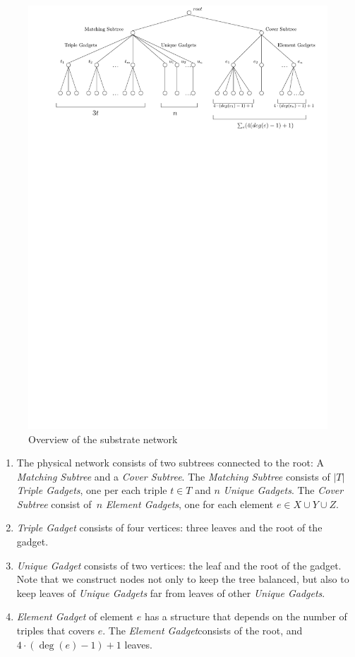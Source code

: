 \documentclass[preprint,12pt]{elsarticle}
\newcommand{\MatchSubtree}{{\emph{Matching Subtree}}}
\newcommand{\CoverSubtree}{{\emph{Cover Subtree}}}
\newcommand{\TripleGadget}{{\emph{Triple Gadget}}}
\newcommand{\TripleGadgets}{{\emph{Triple Gadgets}}}
\newcommand{\UnqGadget}{{\emph{Unique Gadget}}}
\newcommand{\UnqGadgets}{{\emph{Unique Gadgets}}}
\newcommand{\ElGadget}{{\emph{Element Gadget}}}
\newcommand{\ElGadgets}{{\emph{Element Gadgets}}}
\begin{document}
\begin{figure}[t]
  \centering
  \includegraphics[width=0.99\columnwidth]{reduction/overview.pdf}
  \vspace{-1em}
  \caption{Overview of the substrate network}
  \vspace{-1em}
\end{figure}


\begin{enumerate}
  \item The physical network consists of two subtrees connected to the
  root: A {\MatchSubtree} and a {\CoverSubtree}. The
  {\MatchSubtree} consists of $|T|$ {\TripleGadgets}, one per each triple $t\in T$ and $n$
  {\UnqGadgets}. The {\CoverSubtree} consist of~$n$ {\ElGadgets}, one for each element $e\in X\cup Y\cup Z$.
  \item {\TripleGadget} consists of four vertices: three leaves and the root of the gadget.
  \item {\UnqGadget} consists of two vertices: the leaf and the root of the gadget. Note that we construct
  nodes not only to keep the tree balanced, but also to keep leaves of
  {\UnqGadgets} far from leaves of other \UnqGadgets.
  \item {\ElGadget} of element $e$ has a structure that depends on the number of triples that covers $e$. The \ElGadget consists of the
  root, and~$4\cdot(\deg(e)-1)+1$ leaves.
\end{enumerate}
\end{document}
